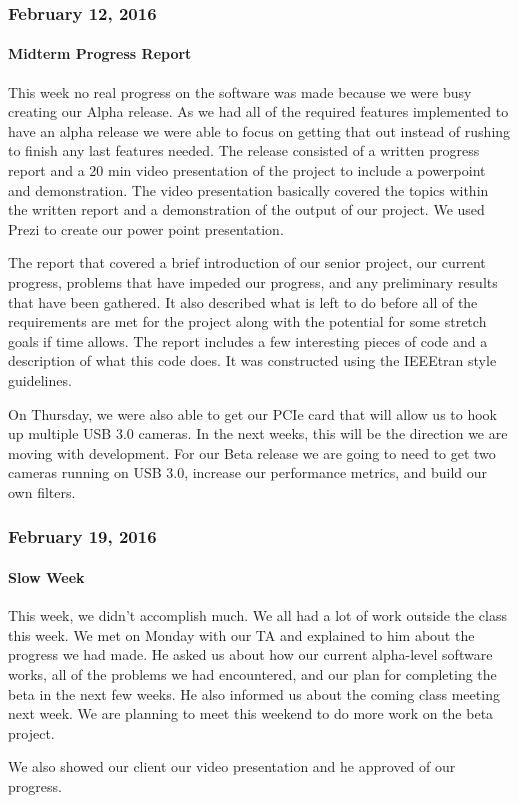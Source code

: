 \subsubsection{February 12, 2016}
\paragraph{Midterm Progress Report}
This week no real progress on the software was made because we were busy creating our Alpha release. As we had all of the required features implemented to have an alpha release we were able to focus on getting that out instead of rushing to finish any last features needed. The release consisted of a written progress report and a 20 min video presentation of the project to include a powerpoint and demonstration. The video presentation basically covered the topics within the written report and a demonstration of the output of our project. We used Prezi to create our power point presentation.
\par
The report that covered a brief introduction of our senior project, our current progress, problems that have impeded our progress, and any preliminary results that have been gathered. It also described what is left to do before all of the requirements are met for the project along with the potential for some stretch goals if time allows. The report includes a few interesting pieces of code and a description of what this code does. It was constructed using the IEEEtran style guidelines.
\par
On Thursday, we were also able to get our PCIe card that will allow us to hook up multiple USB 3.0 cameras. In the next weeks, this will be the direction we are moving with development. For our Beta release we are going to need to get two cameras running on USB 3.0, increase our performance metrics, and build our own filters.\\

\subsubsection{February 19, 2016}
\paragraph{Slow Week}
This week, we didn't accomplish much. We all had a lot of work outside the class this week. We met on Monday with our TA and explained to him about the progress we had made. He asked us about how our current alpha-level software works, all of the problems we had encountered, and our plan for completing the beta in the next few weeks. He also informed us about the coming class meeting next week. We are planning to meet this weekend to do more work on the beta project.
\par
We also showed our client our video presentation and he approved of our progress.\\

